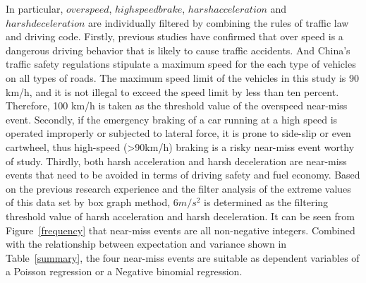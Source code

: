 \documentclass[entropy,article,submit,moreauthors,LaTeX and dvi2pdf]{Definitions/mdpi}
\begin{document}
\begin{paracol}{2}
\linenumbers
\switchcolumn
In particular, $overspeed$, $highspeedbrake$, $harshacceleration$ and $harshdeceleration$ are individually filtered by combining the rules of traffic law and driving code. Firstly, previous studies have confirmed that over speed is a dangerous driving behavior that is likely to cause traffic accidents\cite{litman2007distance}. And China's traffic safety regulations stipulate a maximum speed for the each type of vehicles on all types of roads. The maximum speed limit of the vehicles in this study is 90 km/h, and it is not illegal to exceed the speed limit by less than ten percent. Therefore, 100 km/h is taken as the threshold value of the overspeed near-miss event. Secondly, if the emergency braking of a car running at a high speed is operated improperly or subjected to lateral force, it is prone to side-slip or even cartwheel, thus high-speed (>90km/h) braking is a risky near-miss event worthy of study. Thirdly, both harsh acceleration and harsh deceleration are near-miss events that need to be avoided in terms of driving safety and fuel economy. Based on the previous research experience\cite{gao2019evaluation,guillen2020can} and the filter analysis of the extreme values of this data set by box graph method, $6m/s^2$ is determined as the filtering threshold value of harsh acceleration and harsh deceleration. It can be seen from Figure~\ref{frequency} that near-miss events are all non-negative integers. Combined with the relationship between expectation and variance shown in Table~\ref{summary}, the four near-miss events are suitable as dependent variables of a Poisson regression or a Negative binomial regression.
\end{paracol}
\end{document}
